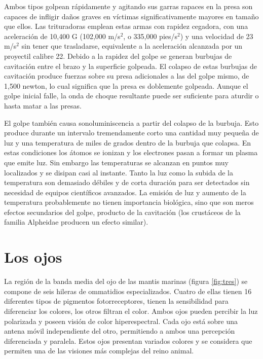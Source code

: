 \documentclass[10pt,twocolumn]{article}
\begin{document}
Ambos tipos golpean rápidamente y agitando sus garras rapaces en la presa son capaces de infligir daños graves en víctimas significativamente mayores en tamaño que ellos. Las trituradoras emplean estas armas con rapidez cegadora, con una aceleración de 10,400 G (102,000 m/s$^{2}$, o 335,000 pies/s$^{2}$) y una velocidad de 23 m/s$^{2}$ sin tener que trasladarse\cite{patek_deadly_2004}, equivalente a la aceleración alcanzada por un proyectil calibre 22. Debido a la rapidez del golpe se generan burbujas de cavitación entre el brazo y la superficie golpeada. El colapso de estas burbujas de cavitación produce fuerzas sobre su presa adicionales a las del golpe mismo, de 1,500 newton, lo cual significa que la presa es doblemente golpeada. Aunque el golpe inicial falle, la onda de choque resultante puede ser suficiente para aturdir o hasta matar a las presas.

El golpe también causa sonoluminiscencia a partir del colapso de la burbuja. Esto produce durante un intervalo tremendamente corto una cantidad muy pequeña de luz y una temperatura de miles de grados dentro de la burbuja que colapsa. En estas condiciones los átomos se ionizan y los electrones pasan a formar un plasma que emite luz. Sin embargo las temperaturas se alcanzan en puntos muy localizados y se disipan casi al instante. Tanto la luz como la subida de la temperatura son demasiado débiles y de corta duración para ser detectados sin necesidad de equipos científicos avanzados. La emisión de luz y aumento de la temperatura probablemente no tienen importancia biológica, sino que son meros efectos secundarios del golpe, producto de la cavitación (los crustáceos de la familia Alpheidae producen un efecto similar).

\section{Los ojos}

La región de la banda media del ojo de las mantis marinas (figura \ref{fig:tres}) se compone de seis hileras de ommatidios especializados. Cuatro de ellas tienen 16 diferentes tipos de pigmentos fotorreceptores, tienen la sensibilidad para diferenciar los colores, los otros filtran el color. Ambos ojos pueden percibir la luz polarizada y poseen visión de color hiperespectral. Cada ojo está sobre una antena móvil independiente del otro, permitiendo a ambos una percepción diferenciada y paralela. Estos ojos presentan variados colores y se considera que permiten una de las visiones más complejas del reino animal.
\end{document}
